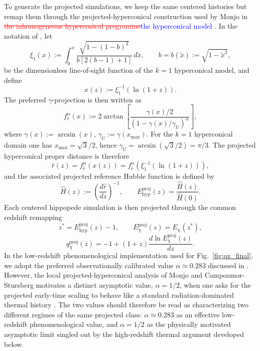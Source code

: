 \documentclass[preprint,12pt]{elsarticle}
\begin{document}
To generate the projected simulations, we keep the same centered histories but remap them through the projected-hyperconical construction used by Monjo in \textcolor{red}{\sout{the inhomogeneous hyperconical programme}}\textcolor{blue}{the hyperconical model} \cite{monjo2017hyperconical, monjo2018projected, monjo2020lagrangian, monjo2023hubble, Monjo_2024}. In the notation of \cite{monjo2018projected}, let
\begin{equation}
\xi_1(x):=\int_{0}^{x}\frac{\sqrt{1-(1-b)^2}}{b\left[2(b-1)+1\right]}\,d\tilde x,
\qquad
b=b(\tilde x):=\sqrt{1-\tilde x^2},
\end{equation}
be the dimensionless line-of-sight function of the $k=1$ hyperconical model, and define
\begin{equation}
x(z):=\xi_1^{-1}(\ln(1+z)).
\end{equation}
The preferred $\gamma$-projection is then written as
\begin{equation}
\label{eq:projection_map}
f_{\hat r}^{\alpha}(x):=
2\arctan\!\left[
\frac{\gamma(x)/2}{\left(1-\gamma(x)/\gamma_U\right)^\alpha}
\right],
\end{equation}
where $\gamma(x):=\arcsin(x)$, $\gamma_U:=\gamma(x_{\max})$. For the $k=1$ hyperconical domain one has $x_{\max}=\sqrt{3}/2$, hence $\gamma_U=\arcsin\!\left(\sqrt{3}/2\right)= \pi/3$. The projected hyperconical proper distance is therefore
\begin{equation}
\hat r(z)= f_{\hat r}^{\alpha}\!\left(x(z)\right)
= f_{\hat r}^{\alpha}\!\left(\xi_1^{-1}(\ln(1+z))\right),
\end{equation}
and the associated projected reference Hubble function is defined by
\begin{equation}
\hat H(z):=\left(\frac{d\hat r}{dz}\right)^{-1},
\qquad
E_{\mathrm{hyp}}^{\mathrm{proj}}(z)=\frac{\hat H(z)}{\hat H(0)}.
\end{equation}
Each centered hippopede simulation is then projected through the common redshift remapping
\begin{equation}
z^*=E_{\mathrm{hyp}}^{\mathrm{proj}}(z)-1,
\qquad
E^{\mathrm{proj}}_\chi(z)=E_\chi(z^*),
\end{equation}
\begin{equation}
q^{\mathrm{proj}}_\chi(z)=-1+(1+z)\frac{d\ln E^{\mathrm{proj}}_\chi(z)}{dz}.
\end{equation}
In the low-redshift phenomenological implementation used for Fig.~\ref{fig:qz_final}, we adopt the preferred observationally calibrated value $\alpha\simeq0.283$ discussed in \cite{monjo2018projected}. However, the local projected-hyperconical analysis of Monjo and Campoamor-Stursberg motivates a distinct asymptotic value, $\alpha=1/2$, when one asks for the projected early-time scaling to behave like a standard radiation-dominated thermal history \cite{monjo2020lagrangian, monjo2023hubble}. The two values should therefore be read as characterizing two different regimes of the same projected class: $\alpha\simeq0.283$ as an effective low-redshift phenomenological value, and $\alpha=1/2$ as the physically motivated asymptotic limit singled out by the high-redshift thermal argument developed below.
\end{document}
